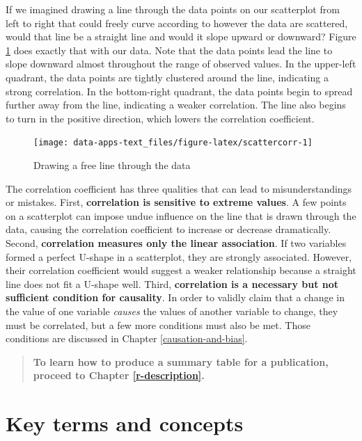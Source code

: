 \documentclass[
]{book}
\begin{document}
If we imagined drawing a line through the data points on our scatterplot from left to right that could freely curve according to however the data are scattered, would that line be a straight line and would it slope upward or downward? Figure \ref{fig:scattercorr} does exactly that with our data. Note that the data points lead the line to slope downward almost throughout the range of observed values. In the upper-left quadrant, the data points are tightly clustered around the line, indicating a strong correlation. In the bottom-right quadrant, the data points begin to spread further away from the line, indicating a weaker correlation. The line also begins to turn in the positive direction, which lowers the correlation coefficient.

\begin{figure}

{\centering \texttt{[image: data-apps-text\_files/figure-latex/scattercorr-1]} 

}

\caption{Drawing a free line through the data}\label{fig:scattercorr}
\end{figure}

The correlation coefficient has three qualities that can lead to misunderstandings or mistakes. First, \textbf{correlation is sensitive to extreme values}. A few points on a scatterplot can impose undue influence on the line that is drawn through the data, causing the correlation coefficient to increase or decrease dramatically. Second, \textbf{correlation measures only the linear association}. If two variables formed a perfect U-shape in a scatterplot, they are strongly associated. However, their correlation coefficient would suggest a weaker relationship because a straight line does not fit a U-shape well. Third, \textbf{correlation is a necessary but not sufficient condition for causality}. In order to validly claim that a change in the value of one variable \emph{causes} the values of another variable to change, they must be correlated, but a few more conditions must also be met. Those conditions are discussed in Chapter \ref{causation-and-bias}.

\begin{quote}
\textbf{To learn how to produce a summary table for a publication, proceed to Chapter \ref{r-description}.}
\end{quote}

\hypertarget{kt4}{%
\section{Key terms and concepts}\label{kt4}}
\end{document}
